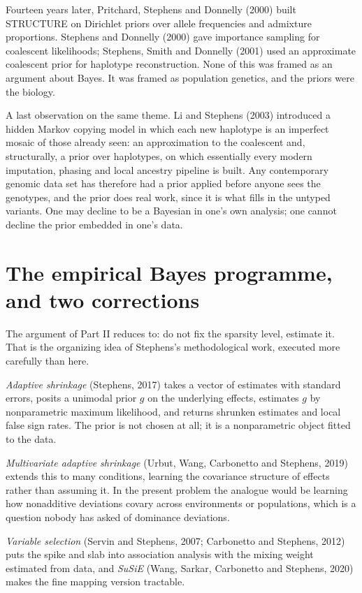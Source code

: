 Fourteen years later, Pritchard, Stephens and Donnelly (2000) built STRUCTURE on Dirichlet priors
over allele frequencies and admixture proportions. Stephens and Donnelly (2000) gave importance
sampling for coalescent likelihoods; Stephens, Smith and Donnelly (2001) used an approximate
coalescent prior for haplotype reconstruction. None of this was framed as an argument about Bayes.
It was framed as population genetics, and the priors were the biology.

A last observation on the same theme. Li and Stephens (2003) introduced a hidden Markov copying
model in which each new haplotype is an imperfect mosaic of those already seen: an approximation to
the coalescent and, structurally, a prior over haplotypes, on which essentially every modern
imputation, phasing and local ancestry pipeline is built. Any contemporary genomic data set has
therefore had a prior applied before anyone sees the genotypes, and the prior does real work, since
it is what fills in the untyped variants. One may decline to be a Bayesian in one's own analysis;
one cannot decline the prior embedded in one's data.

\section{The empirical Bayes programme, and two corrections}
\label{ftns:sec:stephens}

The argument of Part II reduces to: do not fix the sparsity level, estimate it. That is the
organizing idea of Stephens's methodological work, executed more carefully than here.

\emph{Adaptive shrinkage} (Stephens, 2017) takes a vector of estimates with standard errors, posits
a unimodal prior $g$ on the underlying effects, estimates $g$ by nonparametric maximum likelihood,
and returns shrunken estimates and local false sign rates. The prior is not chosen at all; it is a
nonparametric object fitted to the data.

\emph{Multivariate adaptive shrinkage} (Urbut, Wang, Carbonetto and Stephens, 2019) extends this to
many conditions, learning the covariance structure of effects rather than assuming it. In the
present problem the analogue would be learning how nonadditive deviations covary across
environments or populations, which is a question nobody has asked of dominance deviations.

\emph{Variable selection} (Servin and Stephens, 2007; Carbonetto and Stephens, 2012) puts the
spike and slab into association analysis with the mixing weight estimated from data, and
\emph{SuSiE} (Wang, Sarkar, Carbonetto and Stephens, 2020) makes the fine mapping version tractable.

